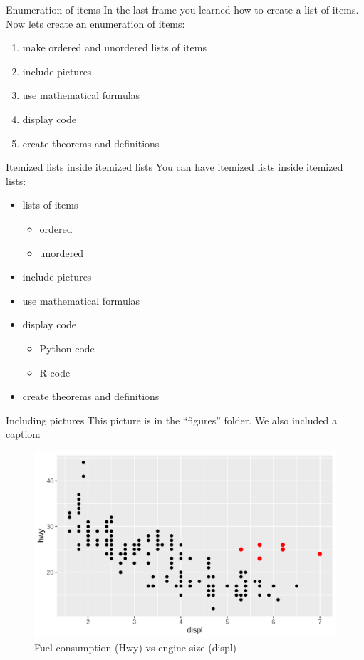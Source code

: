 \begin{frame}{Enumeration of items}
	In the last frame you learned how to create a list of items. Now lets create an enumeration of items:
	\begin{enumerate}
	\item make ordered and unordered lists of items
	\item include pictures
	\item use mathematical formulas
	\item display code
	\item create theorems and definitions
	\end{enumerate}
\end{frame}

\begin{frame}{Itemized lists inside itemized lists}
	You can have itemized lists inside itemized lists:
	\begin{itemize}
	\item lists of items
		\begin{itemize}
		\item ordered
		\item unordered
		\end{itemize}
	\item include pictures
	\item use mathematical formulas
	\item display code
		\begin{itemize}
		\item Python code
		\item R code
		\end{itemize}
	\item create theorems and definitions
	\end{itemize}
\end{frame}

\begin{frame}{Including pictures}
	This picture is in the ``figures'' folder. We also included a caption:
	\begin{figure}
	\includegraphics[scale=.5]{figures/graph.png}
	\caption{Fuel consumption (Hwy) vs engine size (displ)}
	\end{figure}
\end{frame}

